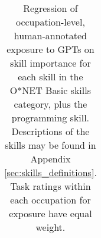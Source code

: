 \begin{table}[h]
\begin{tabular}{@{}l>{\raggedright\arraybackslash}p{2cm}>{\raggedleft\arraybackslash}p{2cm}@{}>{\raggedright\arraybackslash}p{2.5cm}}
\bottomrule
\end{tabular}
\caption{Regression of occupation-level, human-annotated exposure to GPTs on skill importance for each skill in the O*NET Basic skills category, plus the programming skill. Descriptions of the skills may be found in Appendix \ref{sec:skills_definitions}. Task ratings within each occupation for exposure have equal weight.}

\label{tab:skills}
\end{table}
